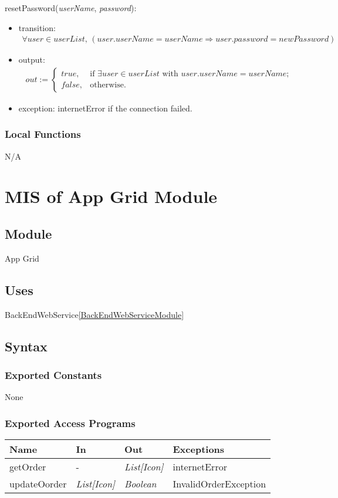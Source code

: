\documentclass[12pt, titlepage]{article}
\begin{document}
\noindent resetPassword(\textit{userName}, \textit{password}):
\begin{itemize}
\item transition: 
\begin{align*}
\forall user \in userList, \, (user.userName = userName \Rightarrow user.password = newPassword)
\end{align*}

\item output: 
\begin{align*}
out := \begin{cases}
true, & \text{if } \exists user \in userList \text{ with } user.userName = userName; \\
false, & \text{otherwise.}
\end{cases}
\end{align*}

\item exception: internetError if the connection failed.
\end{itemize}

\subsubsection{Local Functions}
N/A

\newpage
\section{MIS of App Grid Module} \label{AGModule}

\subsection{Module}
App Grid

\subsection{Uses}
BackEndWebService\ref{BackEndWebServiceModule}

\subsection{Syntax}

\subsubsection{Exported Constants}
None

\subsubsection{Exported Access Programs}
\begin{center}
\begin{tabular}{p{4cm} p{3cm} p{3cm} p{3cm}}
\hline
\textbf{Name} & \textbf{In} & \textbf{Out} & \textbf{Exceptions} \\
\hline
getOrder & - & \textit{List[Icon]} & internetError \\
updateOorder & \textit{List[Icon]} & \textit{Boolean} & InvalidOrderException \\
\hline
\end{tabular}
\end{center}
\end{document}
